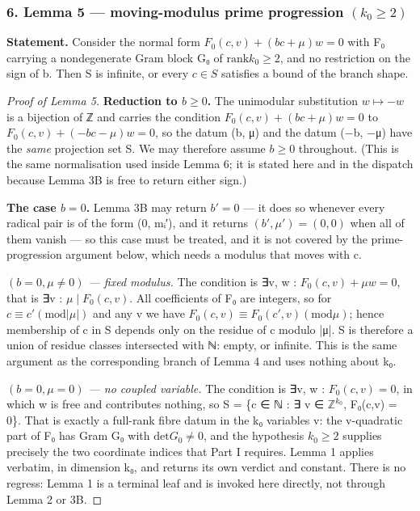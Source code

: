\documentclass[11pt]{article}
\theoremstyle{plain}
\theoremstyle{definition}
\theoremstyle{remark}
\theoremstyle{plain}
\theoremstyle{definition}
\theoremstyle{remark}
\newcounter{Part}
\theoremstyle{plain}
\theoremstyle{definition}
\theoremstyle{remark}
\begin{document}
\subsubsection*{6. Lemma 5 — moving-modulus prime progression $(k_{0} ≥ 2)$}
\textbf{Statement.} Consider the normal form $F_{0}(c, v) + (bc+μ)w = 0$ with F₀ carrying a nondegenerate Gram block G₀ of $\mathrm{rank} k_{0} ≥ 2$, and no restriction on the sign of b. Then S is infinite, or every $c ∈ S$ satisfies a bound of the branch shape.
\begin{proof}[Proof of Lemma 5]

\textbf{Reduction to $b ≥ 0$.} The unimodular substitution $w ↦ −w$ is a bijection of ℤ and carries the condition $F_{0}(c, v) + (bc+μ)w = 0$ to $F_{0}(c, v) + (−bc−μ)w = 0$, so the datum (b, μ) and the datum (−b, −μ) have the \emph{same} projection set S. We may therefore assume $b ≥ 0$ throughout. (This is the same normalisation used inside Lemma 6; it is stated here and in the dispatch because Lemma 3B is free to return either sign.)

\textbf{The case $b = 0$.} Lemma 3B may return $b′ = 0$ — it does so whenever every radical pair is of the form (0, mᵢ′), and it returns $(b′, μ′) = (0,0)$ when all of them vanish — so this case must be treated, and it is not covered by the prime-progression argument below, which needs a modulus that moves with c.

\emph{$(b = 0, μ ≠ 0)$ — fixed modulus.} The condition is ∃v, w : $F_{0}(c,v) + μw = 0$, that is ∃v : $μ ∣ F_{0}(c,v)$. All coefficients of F₀ are integers, so for $c ≡ c′ (\mathrm{mod} |μ|)$ and any v we have $F_{0}(c,v) ≡ F_{0}(c′,v) (\mathrm{mod} μ)$; hence membership of c in S depends only on the residue of c modulo |μ|. S is therefore a union of residue classes intersected with ℕ: empty, or infinite. This is the same argument as the corresponding branch of Lemma 4 and uses nothing about k₀.

\emph{$(b = 0, μ = 0)$ — no coupled variable.} The condition is ∃v, w : $F_{0}(c,v) = 0$, in which w is free and contributes nothing, so S = \{c ∈ ℕ : ∃ v ∈ $ℤ^{k_{0}}$, F₀(c,v) = 0\}. That is exactly a full-rank fibre datum in the k₀ variables v: the v-quadratic part of F₀ has Gram G₀ with $\mathrm{det} G_{0} ≠ 0$, and the hypothesis $k_{0} ≥ 2$ supplies precisely the two coordinate indices that Part I requires. Lemma 1 applies verbatim, in dimension k₀, and returns its own verdict and constant. There is no regress: Lemma 1 is a terminal leaf and is invoked here directly, not through Lemma 2 or 3B.


\end{proof}
\end{document}
